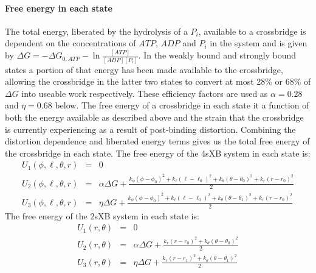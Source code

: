 \documentclass[]{article}
\begin{document}
\paragraph{Free energy in each state} %
The total energy, liberated by the hydrolysis of a $P_i$, available to a crossbridge is dependent on the concentrations of $ATP$, $ADP$ and $P_i$ in the system and is given by $\Delta G = -\Delta G_{0,ATP} - \ln \frac{[ATP]}{[ADP] [P_i]}$. 
In the weakly bound and strongly bound states a portion of that energy has been made available to the crossbridge, allowing the crossbridge in the latter two states to convert at most 28\% or 68\% of $\Delta G$ into useable work respectively. \citep{Pate:1989:p181, Tanner:2007:pe115}
These efficiency factors are used as $\alpha=0.28$ and $\eta=0.68$ below.
The free energy of a crossbridge in each state it a function of both the energy available as described above and the strain that the crossbridge is currently experiencing as a result of post-binding distortion.
Combining the distortion dependence and liberated energy terms gives us the total free energy of the crossbridge in each state.
The free energy of the 4sXB system in each state is: 
\begin{eqnarray}
\label{4sEnergy}
U_1(\phi,\ell,\theta,r) & = & 0 \nonumber \\
U_2(\phi,\ell,\theta,r) & = & \alpha \Delta G + \frac{k_\phi (\phi-\phi_0)^2 + k_\ell (\ell-\ell_0)^2 + k_\theta (\theta-\theta_0)^2 + k_r (r-r_0)^2}{2} \nonumber \\
U_3(\phi,\ell,\theta,r) & = & \eta \Delta G + \frac{k_\phi (\phi-\phi_0)^2 + k_\ell (\ell-\ell_0)^2 + k_\theta (\theta-\theta_1)^2 + k_r (r-r_0)^2}{2} \nonumber
\end{eqnarray}
The free energy of the 2sXB system in each state is: 
\begin{eqnarray}
\label{2sEnergy}
	U_1(r,\theta) & = & 0 \nonumber \\
    U_2(r,\theta) & = & \alpha \Delta G + \frac{k_r (r - r_0)^2 + 
                        k_\theta (\theta - \theta_0)^2}{2} \nonumber \\
    U_3(r,\theta) & = & \eta \Delta G   + \frac{k_r (r - r_1)^2 + 
                        k_\theta (\theta - \theta_1)^2}{2} \nonumber
\end{eqnarray}

\end{document}
